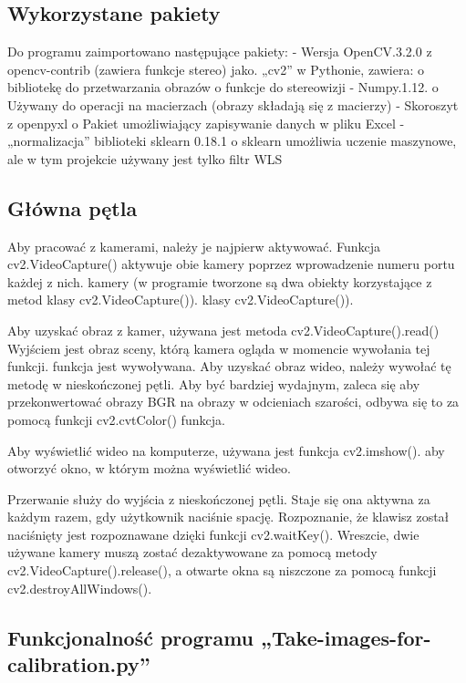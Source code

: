 \documentclass[magisterska]{pracadypl}
\begin{document}
\subsection{Wykorzystane pakiety}

Do programu zaimportowano następujące pakiety:
- Wersja OpenCV.3.2.0 z opencv-contrib (zawiera funkcje stereo) jako.
„cv2” w Pythonie, zawiera:
o bibliotekę do przetwarzania obrazów
o funkcje do stereowizji
- Numpy.1.12.
o Używany do operacji na macierzach (obrazy składają się z macierzy)
- Skoroszyt z openpyxl
o Pakiet umożliwiający zapisywanie danych w pliku Excel
- „normalizacja” biblioteki sklearn 0.18.1
o sklearn umożliwia uczenie maszynowe, ale w tym projekcie używany jest
tylko filtr WLS

\subsection{Główna pętla}

Aby pracować z kamerami, należy je najpierw aktywować. Funkcja
cv2.VideoCapture() aktywuje obie kamery poprzez wprowadzenie numeru portu każdej z nich.
kamery (w programie tworzone są dwa obiekty korzystające z metod klasy cv2.VideoCapture()).
klasy cv2.VideoCapture()).

Aby uzyskać obraz z kamer, używana jest metoda cv2.VideoCapture().read()
Wyjściem jest obraz sceny, którą kamera ogląda w momencie wywołania tej funkcji.
funkcja jest wywoływana. Aby uzyskać obraz wideo, należy wywołać tę metodę
w nieskończonej pętli. Aby być bardziej wydajnym, zaleca się
aby przekonwertować obrazy BGR na obrazy w odcieniach szarości, odbywa się to za pomocą funkcji cv2.cvtColor()
funkcja.

Aby wyświetlić wideo na komputerze, używana jest funkcja cv2.imshow().
aby otworzyć okno, w którym można wyświetlić wideo.

Przerwanie służy do wyjścia z nieskończonej pętli. Staje się ona aktywna
za każdym razem, gdy użytkownik naciśnie spację. Rozpoznanie, że klawisz został naciśnięty
jest rozpoznawane dzięki funkcji cv2.waitKey().
Wreszcie, dwie używane kamery muszą zostać dezaktywowane za pomocą metody
cv2.VideoCapture().release(), a otwarte okna są niszczone za pomocą funkcji
cv2.destroyAllWindows().

\subsection{Funkcjonalność programu „Take-images-for-calibration.py”}
\end{document}
